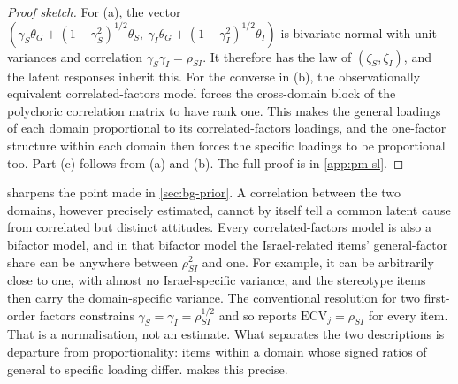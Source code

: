 \begin{proof}[Proof sketch]
For (a), the vector $(\gamma_S\theta_G+(1-\gamma_S^2)^{1/2}\theta_S,\ \gamma_I\theta_G+(1-\gamma_I^2)^{1/2}\theta_I)$ is bivariate normal with unit variances and correlation $\gamma_S\gamma_I=\rho_{SI}$. It therefore has the law of $(\zeta_S,\zeta_I)$, and the latent responses inherit this. For the converse in (b), the observationally equivalent correlated-factors model forces the cross-domain block of the polychoric correlation matrix to have rank one. This makes the general loadings of each domain proportional to its correlated-factors loadings, and the one-factor structure within each domain then forces the specific loadings to be proportional too. Part (c) follows from (a) and (b). The full proof is in \cref{app:pm-sl}.
\end{proof}

 sharpens the point made in \cref{sec:bg-prior}. A correlation between the two domains, however precisely estimated, cannot by itself tell a common latent cause from correlated but distinct attitudes. Every correlated-factors model is also a bifactor model, and in that bifactor model the Israel-related items' general-factor share can be anywhere between $\rho_{SI}^2$ and one. For example, it can be arbitrarily close to one, with almost no Israel-specific variance, and the stereotype items then carry the domain-specific variance. The conventional resolution for two first-order factors constrains $\gamma_S=\gamma_I=\rho_{SI}^{1/2}$ and so reports $\mathrm{ECV}_j=\rho_{SI}$ for every item. That is a normalisation, not an estimate. What separates the two descriptions is departure from proportionality: items within a domain whose signed ratios of general to specific loading differ.  makes this precise.

